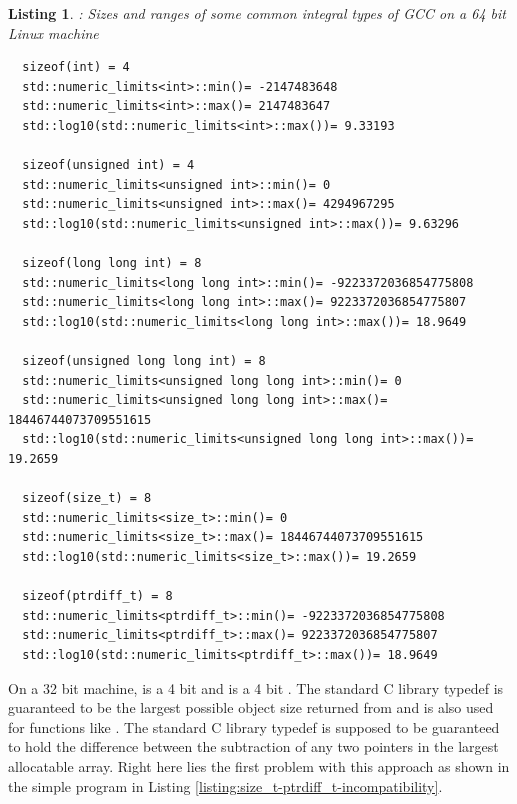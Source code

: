 \documentclass[pdf,ps2pdf,11pt]{SANDreport}
\newtheorem{listing}{Listing}
\begin{document}
{}\begin{listing}: Sizes and ranges of some common integral types of
GCC on a 64 bit Linux machine
\label{listing:integral-type-sizes}
{\small\begin{verbatim}
  sizeof(int) = 4
  std::numeric_limits<int>::min()= -2147483648
  std::numeric_limits<int>::max()= 2147483647
  std::log10(std::numeric_limits<int>::max())= 9.33193
  
  sizeof(unsigned int) = 4
  std::numeric_limits<unsigned int>::min()= 0
  std::numeric_limits<unsigned int>::max()= 4294967295
  std::log10(std::numeric_limits<unsigned int>::max())= 9.63296
  
  sizeof(long long int) = 8
  std::numeric_limits<long long int>::min()= -9223372036854775808
  std::numeric_limits<long long int>::max()= 9223372036854775807
  std::log10(std::numeric_limits<long long int>::max())= 18.9649
  
  sizeof(unsigned long long int) = 8
  std::numeric_limits<unsigned long long int>::min()= 0
  std::numeric_limits<unsigned long long int>::max()= 18446744073709551615
  std::log10(std::numeric_limits<unsigned long long int>::max())= 19.2659
  
  sizeof(size_t) = 8
  std::numeric_limits<size_t>::min()= 0
  std::numeric_limits<size_t>::max()= 18446744073709551615
  std::log10(std::numeric_limits<size_t>::max())= 19.2659
  
  sizeof(ptrdiff_t) = 8
  std::numeric_limits<ptrdiff_t>::min()= -9223372036854775808
  std::numeric_limits<ptrdiff_t>::max()= 9223372036854775807
  std::log10(std::numeric_limits<ptrdiff_t>::max())= 18.9649
\end{verbatim}}
\end{listing}


On a 32 bit machine, {} is a 4 bit {}
and {} is a 4 bit {}.  The standard C library
typedef {} is guaranteed to be the largest possible
object size returned from {} and is also used for
functions like {}.  The standard C library typedef
{} is supposed to be guaranteed to hold the difference
between the subtraction of any two pointers in the largest allocatable
array.  Right here lies the first problem with this approach as shown
in the simple program in Listing
{}\ref{listing:size_t-ptrdiff_t-incompatibility}.
\end{document}
